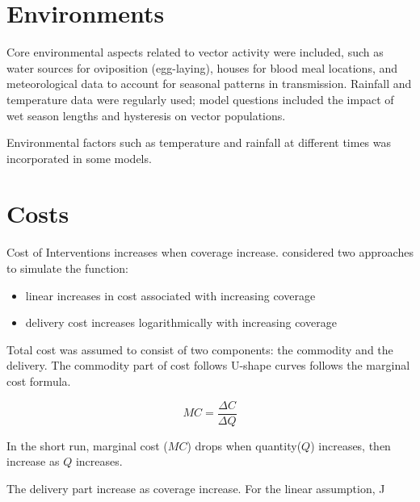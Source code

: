 \documentclass[a4paper, 12pt, twoside]{article}
\begin{document}
\section{Environments}%
\label{sec:environments}
Core environmental aspects related to vector activity were included, such as water sources for oviposition (egg-laying)\cite{Bomblies2008}, houses for blood meal locations\cite{Gu2009a}, and meteorological data to account for seasonal patterns in transmission\cite{Depinay2004}.
Rainfall and temperature data were regularly used; model questions included the impact of wet season lengths\cite{Endo2016a} and hysteresis\cite{Yamana2017} on vector populations.

Environmental factors such as temperature and rainfall at different times was incorporated in some models.


\section{Costs}
Cost of Interventions increases when coverage increase.\cite{Winskill2017a} considered two approaches to simulate the function:
\begin{itemize}
	\item linear increases in cost associated with increasing coverage
	\item delivery cost increases logarithmically with increasing coverage
\end{itemize}

Total cost was assumed to consist of two components: the commodity and the delivery. The commodity part of cost follows U-shape curves follows the marginal cost formula.

$$ MC = \frac{\Delta C}{\Delta Q} $$

In the short run, marginal cost ($MC$) drops when quantity($Q$) increases, then increase as $Q$ increases.

The delivery part increase as coverage increase. For the linear assumption, J
\end{document}
